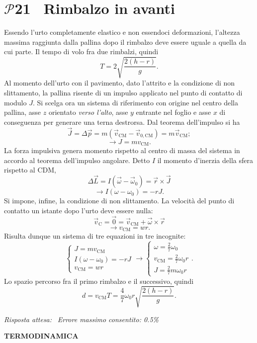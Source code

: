 \documentclass[a4paper,12pt]{article}
\newcommand{\problemtitle}[1]{
  \noindent
  \textbf{\Large #1}\hspace{0.5em}
  \raisebox{0.6ex}{\rule{\linewidth - \widthof{\textbf{\Large #1}} - 0.6em}{0.4pt}}%
}
\newcommand{\sectionpage}[1]{
  \clearpage
  \thispagestyle{sectionpage} %
  \vspace*{\fill}
  \begin{center}
    \Huge\bfseries #1
  \end{center}
  \vspace*{\fill}
  \clearpage
}
\begin{document}
\section*{\problemtitle{$\mathcal{P}${\small{21}} \, Rimbalzo in avanti }}
Essendo l'urto completamente elastico e non essendoci deformazioni, l'altezza massima raggiunta dalla pallina dopo il rimbalzo deve essere uguale a quella da cui parte. Il tempo di volo fra due rimbalzi, quindi
\[
T = 2\sqrt{\frac{2(h-r)}{g}}.
\]
Al momento dell'urto con il pavimento, dato l'attrito e la condizione di non slittamento, la pallina risente di un impulso applicato nel punto di contatto di modulo $J$. Si scelga ora un sistema di riferimento con origine nel centro della pallina, asse $z$ orientato \textit{verso l'alto}, asse $y$ entrante nel foglio e asse $x$ di conseguenza per generare una terna destrorsa. Dal teorema dell'impulso si ha 
\[
\vec{J} = \Delta \vec{p} = m(\vec{v}_{\text{CM}} - \vec{v}_{0,\text{CM}}) = m\vec{v}_{\text{CM}};
\]
\[
\rightarrow J = mv_{\text{CM}}.
\]
La forza impulsiva genera momento rispetto al centro di massa del sistema in accordo al teorema dell'impulso angolare. Detto $I$ il momento d'inerzia della sfera rispetto al CDM,
\[
\Delta \vec{L} = I(\vec{\omega} - \vec{\omega}_0) = \vec{r} \times \vec{J}
\]
\[
\rightarrow I(\omega -\omega_0) = -rJ.
\]
Si impone, infine, la condizione di non slittamento. La velocità del punto di contatto un istante dopo l'urto deve essere nulla:
\[
\vec{v}_{\text{C}} = \vec{0} = \vec{v}_{\text{CM}} + \vec{\omega} \times \vec{r}
\]
\[
\rightarrow v_{\text{CM}} = wr.
\]
Risulta dunque un sistema di tre equazioni in tre incognite:
\[
\begin{cases}
J = mv_{\text{CM}} \\
I(\omega -\omega_0) = -rJ \\
v_{\text{CM}} = wr
\end{cases}
\rightarrow
\begin{cases}
\omega =  \frac{2}{7}\omega_0 \\
v_{\text{CM}} = \frac{2}{7}\omega_0r \\
J = \frac{2}{7}m\omega_0r
\end{cases}
.
\]
Lo spazio percorso fra il primo rimbalzo e il successivo, quindi
\[
d = v_{\text{CM}}T =  \frac{4}{7}\omega_0r\sqrt{\frac{2(h-r)}{g}}.
\]

\textit{Risposta attesa:}  \, \textit{Errore massimo consentito: 0.5\%}




\sectionpage{TERMODINAMICA}
{}
\end{document}
